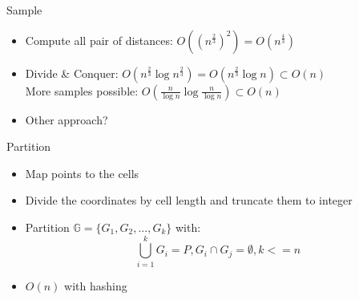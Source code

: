 \documentclass[18pt]{beamer}
\def \loose {15pt}
\begin{document}

\begin{frame}{Sample}
	\begin{itemize}
	\setlength{\itemsep}{\loose}
		\item Compute all pair of distances: $O((n^{\frac{2}{3}})^2) = O(n^{\frac{4}{3}})$
		\item Divide \& Conquer: $O(n^{\frac{2}{3}}\log n^{\frac{2}{3}}) = O(n^{\frac{2}{3}}\log n) \subset O(n)$ \\
		\hspace{1em} More samples possible: $O(\frac{n}{\log n} \log \frac{n}{\log n}) \subset O(n) $
		\item Other approach?
	\end{itemize}
\end{frame}

\begin{frame}{Partition}
	\begin{itemize}
		\setlength{\itemsep}{\loose}
		\item Map points to the cells
		\item Divide the coordinates by cell length and truncate them to integer

		\item Partition $\mathbb{G} = \{G_1, G_2, ..., G_k\}$ with:
			 $$\bigcup_{i=1}^k G_i = P, G_i \cap G_j = \emptyset, k <= n$$
				\item $O(n)$ with hashing
	\end{itemize}
\end{frame}
\end{document}
